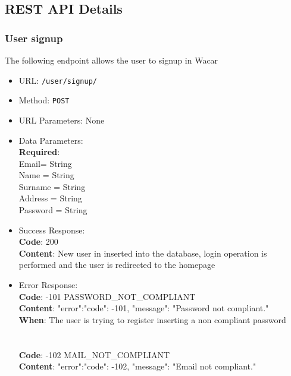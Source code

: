 \subsection{REST API Details}


\subsubsection*{User signup}


The following endpoint allows the user to signup in Wacar

\begin{itemize}
    \item URL: \texttt{/user/signup/}
    \item Method: \texttt{POST}
    \item URL Parameters: None
    \item Data Parameters: \\
    \textbf{Required}:\\
    Email= {String}\\
    Name = {String}\\
    Surname = {String}\\
    Address = {String}\\
    Password = {String}\\
    \item Success Response:\\
    \textbf{Code}: 200\\
    \textbf{Content}: New user in inserted into the database, login operation is performed and the user is redirected to the homepage\\
    \item Error Response:\\
    \textbf{Code}: -101 PASSWORD\_NOT\_COMPLIANT\\
    \textbf{Content}: {"error":{"code": -101, "message": "Password not compliant."}}\\
    \textbf{When}: The user is trying to register inserting a non compliant password\\
    \\
    \\
    \textbf{Code}: -102 MAIL\_NOT\_COMPLIANT\\
    \textbf{Content}: {"error":{"code": -102, "message": "Email not compliant."}}\\

\end{itemize}
